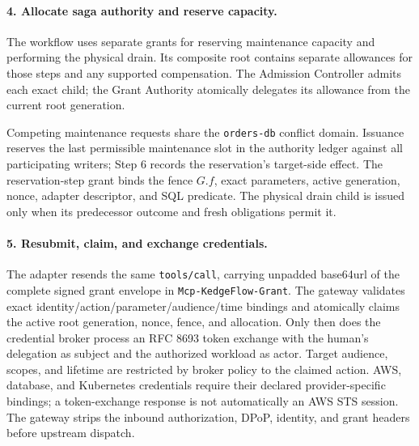 \paragraph{4. Allocate saga authority and reserve capacity.}
The workflow uses separate grants for reserving maintenance capacity and performing the physical drain. Its composite root contains separate allowances for those steps and any supported compensation. The Admission Controller admits each exact child; the Grant Authority atomically delegates its allowance from the current root generation.

Competing maintenance requests share the \texttt{orders-db} conflict domain. Issuance reserves the last permissible maintenance slot in the authority ledger against all participating writers; Step 6 records the reservation's target-side effect. The reservation-step grant binds the fence $G.f$, exact parameters, active generation, nonce, adapter descriptor, and SQL predicate. The physical drain child is issued only when its predecessor outcome and fresh obligations permit it.

\paragraph{5. Resubmit, claim, and exchange credentials.}
The adapter resends the same \texttt{tools/call}, carrying unpadded base64url of the complete signed grant envelope in \texttt{Mcp-KedgeFlow-Grant}. The gateway validates exact identity/action/parameter/audience/time bindings and atomically claims the active root generation, nonce, fence, and allocation. Only then does the credential broker process an RFC 8693 token exchange with the human's delegation as subject and the authorized workload as actor. Target audience, scopes, and lifetime are restricted by broker policy to the claimed action. AWS, database, and Kubernetes credentials require their declared provider-specific bindings; a token-exchange response is not automatically an AWS STS session. The gateway strips the inbound authorization, DPoP, identity, and grant headers before upstream dispatch.

